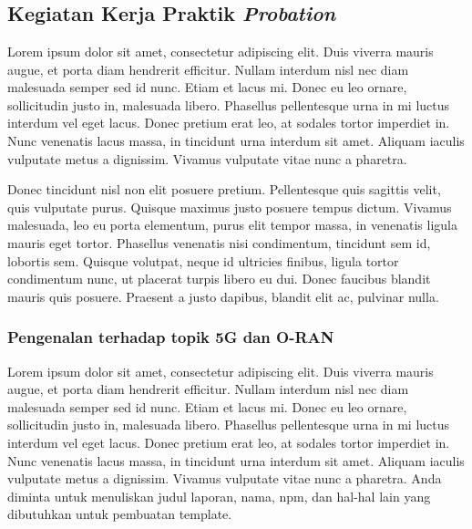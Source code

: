 \chapter{\babEmpat}

\section{Kegiatan Kerja Praktik \textit{Probation}}

Lorem ipsum dolor sit amet, consectetur adipiscing elit. Duis viverra mauris 
augue, et porta diam hendrerit efficitur. Nullam interdum nisl nec diam 
malesuada semper sed id nunc. Etiam et lacus mi. Donec eu leo ornare, 
sollicitudin justo in, malesuada libero. Phasellus pellentesque urna in mi luctus 
interdum vel eget lacus. Donec pretium erat leo, at sodales tortor imperdiet in. 
Nunc venenatis lacus massa, in tincidunt urna interdum sit amet. Aliquam iaculis 
vulputate metus a dignissim. Vivamus vulputate vitae nunc a pharetra.

Donec tincidunt nisl non elit posuere pretium. Pellentesque quis sagittis velit, 
quis vulputate purus. Quisque maximus justo posuere tempus dictum. Vivamus 
malesuada, leo eu porta elementum, purus elit tempor massa, in venenatis ligula 
mauris eget tortor. Phasellus venenatis nisi condimentum, tincidunt sem id, 
lobortis sem. Quisque volutpat, neque id ultricies finibus, ligula tortor 
condimentum nunc, ut placerat turpis libero eu dui. Donec faucibus blandit 
mauris quis posuere. Praesent a justo dapibus, blandit elit ac, pulvinar nulla. 

  \subsection{Pengenalan terhadap topik 5G dan O-RAN}

  Lorem ipsum dolor sit amet, consectetur adipiscing elit. Duis viverra mauris 
  augue, et porta diam hendrerit efficitur. Nullam interdum nisl nec diam 
  malesuada semper sed id nunc. Etiam et lacus mi. Donec eu leo ornare, 
  sollicitudin justo in, malesuada libero. Phasellus pellentesque urna in mi luctus 
  interdum vel eget lacus. Donec pretium erat leo, at sodales tortor imperdiet in. 
  Nunc venenatis lacus massa, in tincidunt urna interdum sit amet. Aliquam iaculis 
  vulputate metus a dignissim. Vivamus vulputate vitae nunc a pharetra.
  Anda diminta untuk menuliskan judul laporan, nama, npm, dan hal-hal lain yang 
  dibutuhkan untuk pembuatan template. 

